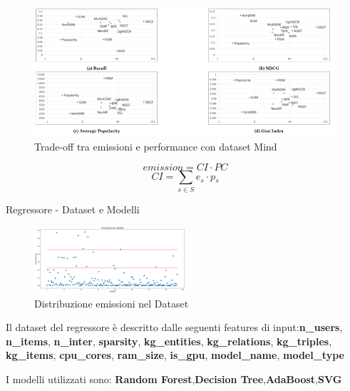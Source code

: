 
\begin{frame}{}
    \begin{figure}[H]
    \centering
    \includegraphics[width=\textwidth]{images/risultati-valutazione.png}
    \caption{Trade-off tra emissioni e performance con dataset Mind}
\end{figure}
\footnotesize
    \begin{equation*}
        \textit{emission} = \textit{CI}  \cdot \textit{PC}
    \end{equation*}
    \begin{equation*}
        \textit{CI} = \sum_{s \in S} \textit{e$_s$} \cdot \textit{p$_s$}
    \end{equation*}
\end{frame}

\begin{frame}{Regressore - Dataset e Modelli}
    \begin{figure}
        \centering
        \includegraphics[width=0.5\textwidth]{images/situazione-attuale.png}
        \caption{Distribuzione emissioni nel Dataset}
    \end{figure}
    \small
    Il dataset del regressore è descritto dalle seguenti features di input:\textbf{n\_users}, \textbf{n\_items}, \textbf{n\_inter}, \textbf{sparsity}, \textbf{kg\_entities}, \textbf{kg\_relations}, \textbf{kg\_triples}, \textbf{kg\_items}, \textbf{cpu\_cores}, \textbf{ram\_size}, \textbf{is\_gpu}, \textbf{model\_name}, \textbf{model\_type}
    \vspace{1em}

    I modelli utilizzati sono:
     \textbf{Random Forest},\textbf{Decision Tree},\textbf{AdaBoost},\textbf{SVG}
\end{frame}
    


